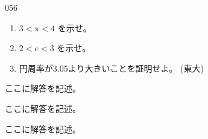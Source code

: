 \begin{thm}{056}{}{}
 \begin{enumerate}
  \item $3<\pi<4$ を示せ。
  \item $2<e<3$ を示せ。 
  \item 円周率が3.05より大きいことを証明せよ。  (東大)
 \end{enumerate}
\end{thm}

ここに解答を記述。

ここに解答を記述。

ここに解答を記述。